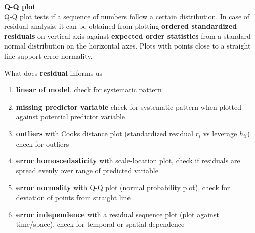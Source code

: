 \documentclass[11pt]{article}
\begin{document}
\begin{defn*}
    \textbf{Q-Q plot} \\
    Q-Q plot tests if a sequence of numbers follow a certain distribution. In case of residual analysis, it can be obtained from plotting \textbf{ordered standardized residuals} on vertical axis against \textbf{expected order statistics} from a standard normal distribution on the horizontal axes. Plots with points close to a straight line support error normality. 
\end{defn*}


\begin{defn*}
    What does \textbf{residual} informs us 
    \begin{enumerate}
        \item \textbf{linear of model}, check for systematic pattern 
        \item \textbf{missing predictor variable} check for systematic pattern when plotted against potential predictor variable
        \item \textbf{outliers} with Cooks distance plot (standardized residual $r_i$ vs leverage $h_{ii}$) check for outliers 
        \item \textbf{error homoscedasticity} with scale-location plot, check if residuals are spread evenly over range of predicted variable 
        \item \textbf{error normality} with Q-Q plot (normal probability plot), check for deviation of points from straight line
        \item \textbf{error independence} with a residual sequence plot (plot against time/space), check for temporal or spatial dependence
    \end{enumerate}
\end{defn*}
\end{document}
